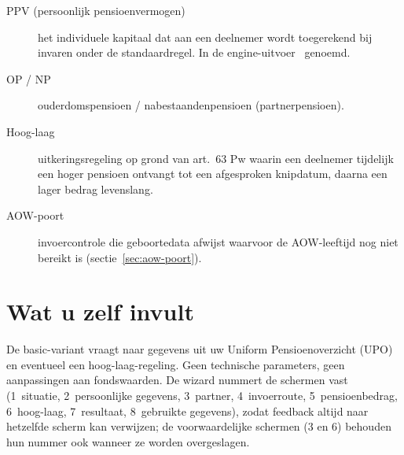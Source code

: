 \documentclass[11pt,a4paper]{article}
\newcommand{\ppktot}{\text{ppkTotal}}
\begin{document}
\begin{description}
\item[PPV (persoonlijk pensioenvermogen)] het individuele kapitaal dat aan een deelnemer wordt toegerekend bij invaren onder de standaardregel. In de engine-uitvoer \ppktot\ genoemd.
\item[OP / NP] ouderdomspensioen / nabestaandenpensioen (partnerpensioen).
\item[Hoog-laag] uitkeringsregeling op grond van art.\ 63 Pw waarin een deelnemer tijdelijk een hoger pensioen ontvangt tot een afgesproken knipdatum, daarna een lager bedrag levenslang.
\item[AOW-poort] invoercontrole die geboortedata afwijst waarvoor de AOW-leeftijd nog niet bereikt is (sectie~\ref{sec:aow-poort}).
\end{description}

\section{Wat u zelf invult}
\label{sec:invoer}

De basic-variant vraagt naar gegevens uit uw Uniform Pensioenoverzicht (UPO) en eventueel een hoog-laag-regeling. Geen technische parameters, geen aanpassingen aan fondswaarden. De wizard nummert de schermen vast (1~situatie, 2~persoonlijke gegevens, 3~partner, 4~invoerroute, 5~pensioenbedrag, 6~hoog-laag, 7~resultaat, 8~gebruikte gegevens), zodat feedback altijd naar hetzelfde scherm kan verwijzen; de voorwaardelijke schermen (3 en 6) behouden hun nummer ook wanneer ze worden overgeslagen.
\end{document}
